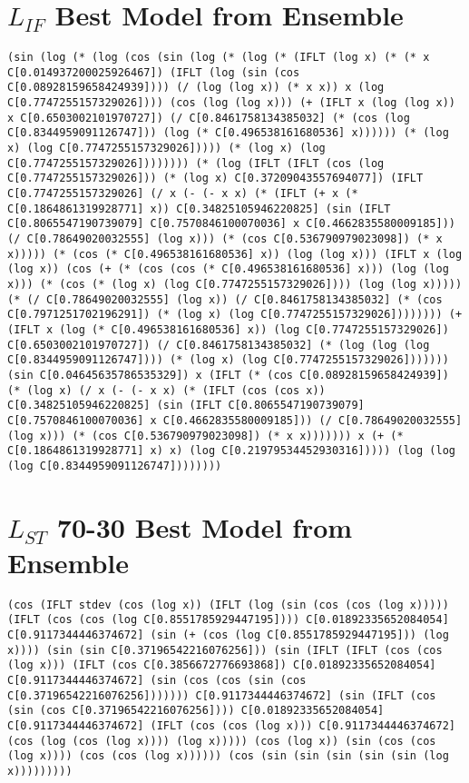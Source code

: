 \documentclass[12pt, letterpaper]{article}
\begin{document}
\begin{appendices}
\section{$L_{IF}$ Best Model from Ensemble}
\label{appendix-b}
\begin{lstlisting}
(sin (log (* (log (cos (sin (log (* (log (* (IFLT (log x) (* (* x C[0.014937200025926467]) (IFLT (log (sin (cos C[0.08928159658424939]))) (/ (log (log x)) (* x x)) x (log C[0.7747255157329026]))) (cos (log (log x))) (+ (IFLT x (log (log x)) x C[0.6503002101970727]) (/ C[0.8461758134385032] (* (cos (log C[0.8344959091126747])) (log (* C[0.496538161680536] x)))))) (* (log x) (log C[0.7747255157329026])))) (* (log x) (log C[0.7747255157329026]))))))) (* (log (IFLT (IFLT (cos (log C[0.7747255157329026])) (* (log x) C[0.37209043557694077]) (IFLT C[0.7747255157329026] (/ x (- (- x x) (* (IFLT (+ x (* C[0.1864861319928771] x)) C[0.34825105946220825] (sin (IFLT C[0.8065547190739079] C[0.7570846100070036] x C[0.4662835580009185])) (/ C[0.78649020032555] (log x))) (* (cos C[0.536790979023098]) (* x x))))) (* (cos (* C[0.496538161680536] x)) (log (log x))) (IFLT x (log (log x)) (cos (+ (* (cos (cos (* C[0.496538161680536] x))) (log (log x))) (* (cos (* (log x) (log C[0.7747255157329026]))) (log (log x))))) (* (/ C[0.78649020032555] (log x)) (/ C[0.8461758134385032] (* (cos C[0.7971251702196291]) (* (log x) (log C[0.7747255157329026]))))))) (+ (IFLT x (log (* C[0.496538161680536] x)) (log C[0.7747255157329026]) C[0.6503002101970727]) (/ C[0.8461758134385032] (* (log (log (log C[0.8344959091126747]))) (* (log x) (log C[0.7747255157329026])))))) (sin C[0.04645635786535329]) x (IFLT (* (cos C[0.08928159658424939]) (* (log x) (/ x (- (- x x) (* (IFLT (cos (cos x)) C[0.34825105946220825] (sin (IFLT C[0.8065547190739079] C[0.7570846100070036] x C[0.4662835580009185])) (/ C[0.78649020032555] (log x))) (* (cos C[0.536790979023098]) (* x x))))))) x (+ (* C[0.1864861319928771] x) x) (log C[0.21979534452930316])))) (log (log (log C[0.8344959091126747])))))))
\end{lstlisting}

\section{$L_{ST}$ 70-30 Best Model from Ensemble}
\label{appendix-c}
\begin{lstlisting}
(cos (IFLT stdev (cos (log x)) (IFLT (log (sin (cos (cos (log x))))) (IFLT (cos (cos (log C[0.8551785929447195]))) C[0.01892335652084054] C[0.9117344446374672] (sin (+ (cos (log C[0.8551785929447195])) (log x)))) (sin (sin C[0.37196542216076256])) (sin (IFLT (IFLT (cos (cos (log x))) (IFLT (cos C[0.3856672776693868]) C[0.01892335652084054] C[0.9117344446374672] (sin (cos (cos (sin (cos C[0.37196542216076256])))))) C[0.9117344446374672] (sin (IFLT (cos (sin (cos C[0.37196542216076256]))) C[0.01892335652084054] C[0.9117344446374672] (IFLT (cos (cos (log x))) C[0.9117344446374672] (cos (log (cos (log x)))) (log x))))) (cos (log x)) (sin (cos (cos (log x)))) (cos (cos (log x)))))) (cos (sin (sin (sin (sin (sin (log x)))))))))
\end{lstlisting}


\end{appendices}
\end{document}
